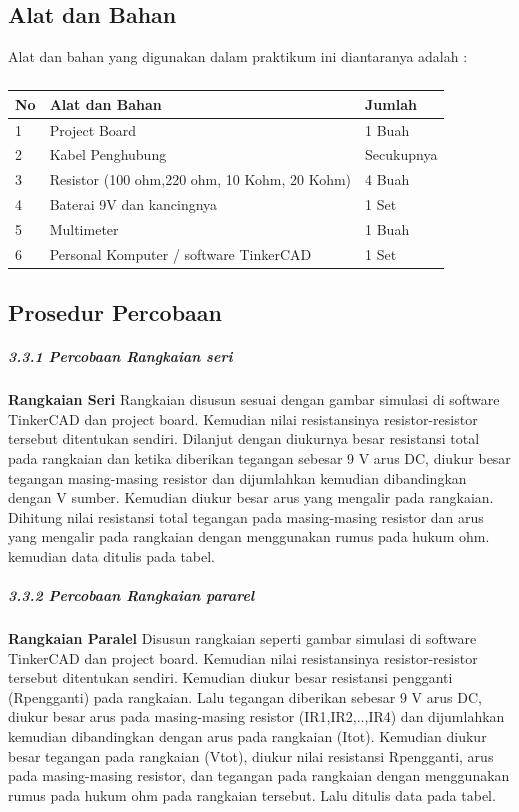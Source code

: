 \documentclass[12pt,a4paper]{article}
\begin{document}
\subsection{Alat dan Bahan}
Alat dan bahan yang digunakan dalam praktikum ini diantaranya adalah : 
\subparagraph*{ }
\begin{tabular}{|l|l|l|}  \hline
No & Alat dan Bahan  & Jumlah  \\ \hline
1  & Project Board & 1 Buah \\ \hline
2  & Kabel Penghubung & Secukupnya \\ \hline
3  & Resistor (100 ohm,220 ohm, 10 Kohm, 20 Kohm)& 4 Buah \\ \hline
4 & Baterai 9V dan kancingnya & 1 Set \\ \hline
5 & Multimeter & 1 Buah \\ \hline
6 & Personal Komputer / software TinkerCAD & 1 Set \\ \hline

\end{tabular}

  
    
\subsection{Prosedur Percobaan}
\subparagraph{3.3.1 Percobaan Rangkaian seri}
\subparagraph{ }
\textbf{Rangkaian Seri} Rangkaian disusun sesuai dengan gambar simulasi di software TinkerCAD dan project board. Kemudian nilai resistansinya resistor-resistor tersebut ditentukan sendiri. Dilanjut dengan diukurnya besar resistansi total pada rangkaian dan ketika diberikan tegangan sebesar 9 V arus DC, diukur besar tegangan masing-masing resistor dan dijumlahkan kemudian dibandingkan dengan V sumber. Kemudian diukur besar arus yang mengalir pada rangkaian. Dihitung nilai resistansi total tegangan pada masing-masing resistor dan arus yang mengalir pada rangkaian dengan menggunakan rumus pada hukum ohm. kemudian data ditulis pada tabel.
\subparagraph{3.3.2 Percobaan Rangkaian pararel}
\subparagraph{ }
\textbf{Rangkaian Paralel} Disusun rangkaian seperti gambar simulasi di software TinkerCAD dan project board. Kemudian nilai resistansinya resistor-resistor tersebut ditentukan sendiri. Kemudian diukur besar resistansi pengganti (Rpengganti) pada rangkaian. Lalu tegangan diberikan sebesar 9 V arus DC, diukur besar arus pada masing-masing resistor (IR1,IR2,..,IR4) dan dijumlahkan kemudian dibandingkan dengan arus pada rangkaian (Itot). Kemudian diukur besar tegangan pada rangkaian (Vtot), diukur nilai resistansi Rpengganti, arus pada masing-masing resistor, dan tegangan pada rangkaian dengan menggunakan rumus pada hukum ohm  pada rangkaian tersebut. Lalu ditulis data pada tabel.
\end{document}
